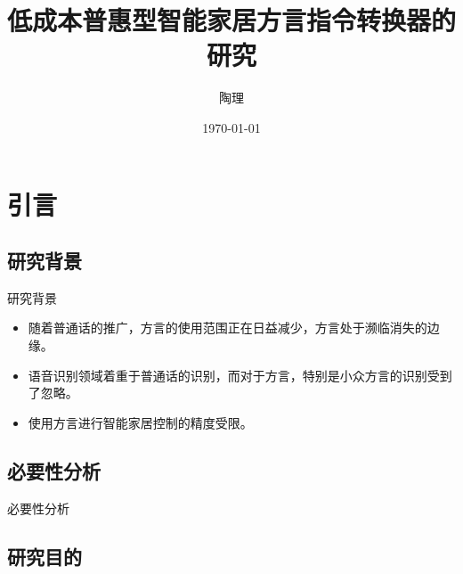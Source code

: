 \documentclass[10pt]{beamer}
\title{低成本普惠型智能家居方言指令转换器的研究}
\author{陶理}
\date{\today}
\begin{document}
\maketitle
\begin{frame}
    \centering
    \tableofcontents
\end{frame}
\section{引言}
\subsection{研究背景}
\begin{frame}{研究背景}
    \begin{itemize}
        \item 随着普通话的推广，方言的使用范围正在日益减少，方言处于濒临消失的边缘。
        \item 语音识别领域着重于普通话的识别，而对于方言，特别是小众方言的识别受到了忽略。
        \item 使用方言进行智能家居控制的精度受限。
    \end{itemize}
\end{frame}
\subsection{必要性分析}
\begin{frame}{必要性分析}
\end{frame}
\subsection{研究目的}
\end{document}

